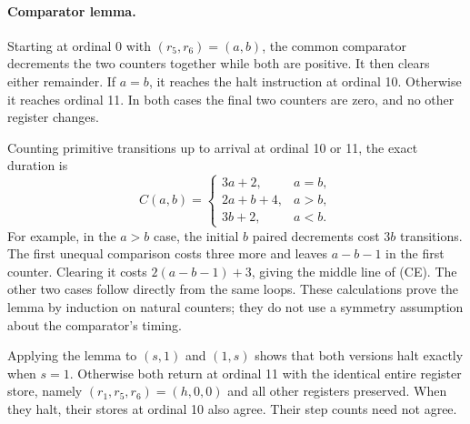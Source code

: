 \paragraph{Comparator lemma.}
Starting at ordinal 0 with $(r_5,r_6)=(a,b)$, the common comparator
decrements the two counters together while both are positive. It then
clears either remainder. If $a=b$, it reaches the halt instruction at
ordinal 10. Otherwise it reaches ordinal 11. In both cases the final two
counters are zero, and no other register changes.

Counting primitive transitions up to arrival at ordinal 10 or 11, the
exact duration is
\[
 C(a,b)=
 \begin{cases}
 3a+2,&a=b,\\
 2a+b+4,&a>b,\\
 3b+2,&a<b.
 \end{cases}                                                   \tag{CE}
\]
For example, in the $a>b$ case, the initial $b$ paired decrements cost
$3b$ transitions. The first unequal comparison costs three more and
leaves $a-b-1$ in the first counter. Clearing it costs $2(a-b-1)+3$,
giving the middle line of (CE). The other two cases follow directly
from the same loops. These calculations prove the lemma by induction
on natural counters; they do not use a symmetry assumption about the
comparator's timing.

Applying the lemma to $(s,1)$ and $(1,s)$ shows that both versions halt
exactly when $s=1$. Otherwise both return at ordinal 11 with the identical
entire register store, namely $(r_1,r_5,r_6)=(h,0,0)$ and all other
registers preserved. When they halt, their stores at ordinal 10 also
agree. Their step counts need not agree.

